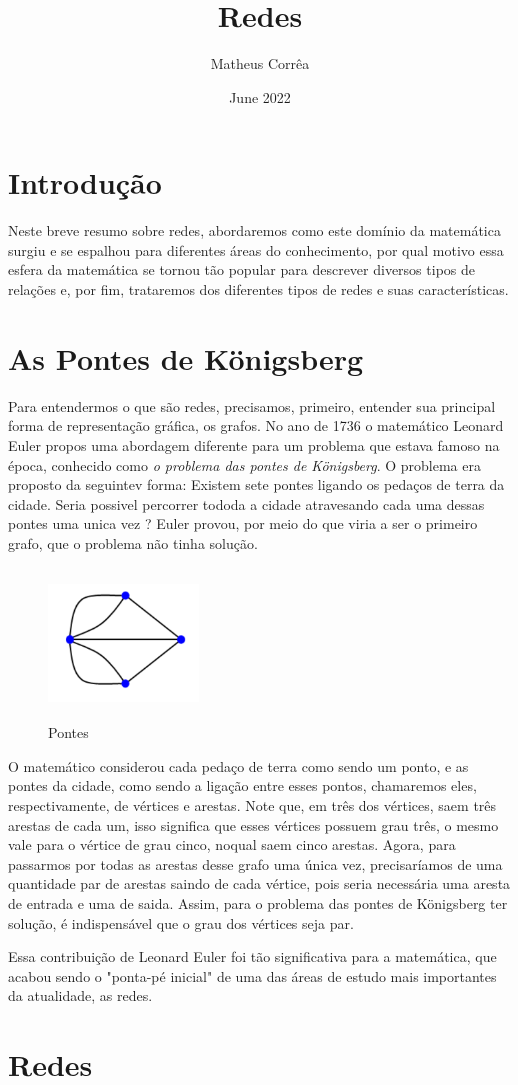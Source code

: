 \documentclass{article}
\title{Redes}
\author{Matheus Corrêa}
\date{June 2022}
\begin{document}
\maketitle

\section{Introdução}
Neste breve resumo sobre redes, abordaremos como este domínio da matemática surgiu e se espalhou para diferentes áreas do conhecimento, por qual motivo essa esfera da matemática se tornou tão popular para descrever diversos tipos de relações e, por fim, trataremos dos diferentes tipos de redes e suas características.

\section{As Pontes de Königsberg}
Para entendermos o que são redes, precisamos, primeiro, entender sua principal forma de representação gráfica, os grafos. No ano de 1736 o matemático Leonard Euler propos uma abordagem diferente para um problema que estava famoso na época, conhecido como  \textit{o problema das pontes de Königsberg}. O problema era proposto da seguintev forma: Existem sete pontes ligando os pedaços de terra da cidade. Seria possivel percorrer tododa a cidade atravesando cada uma dessas pontes uma unica vez ? Euler provou, por meio do que viria a ser o primeiro grafo, que o problema não tinha solução.


\begin{figure}
    \centering
    \includegraphics[width=4cm, height=4cm]{pontes}
    \caption{Pontes}
    \label{fig:my_label}
\end{figure}


O matemático considerou cada pedaço de terra como sendo um ponto, e as pontes da cidade, como sendo a ligação entre esses pontos, chamaremos eles, respectivamente, de vértices e arestas. Note que, em três dos vértices, saem três arestas de cada um, isso significa que esses vértices possuem grau três, o mesmo vale para o vértice de grau cinco, noqual saem cinco arestas. Agora, para passarmos por todas as arestas desse grafo uma única vez, precisaríamos de uma quantidade par de arestas saindo de cada vértice, pois seria necessária uma aresta de entrada e uma de saida. Assim, para o problema das pontes de Königsberg ter solução, é indispensável que o grau dos vértices seja par.

Essa contribuição de Leonard Euler foi tão significativa para a matemática, que acabou sendo o "ponta-pé inicial" de uma das áreas de estudo mais importantes da atualidade, as redes.

\section{Redes}
\end{document}
